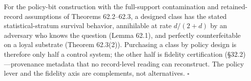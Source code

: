 \begin{thmplain}

For the policy-bit construction with the full-support contamination and retained-record assumptions of Theorems 62.2--62.3, a designed class has the stated statistical-stratum survival behavior, annihilable at rate \(d/(2+d)\) by an adversary who knows the question (Lemma 62.1), and perfectly counterfeitable on a loyal substrate (Theorem 62.3(2)). Purchasing a class by policy design is therefore only half a control system; the other half is fidelity certification (§32.2)---\hspace{0pt}provenance metadata that no record-level reading can reconstruct. The policy lever and the fidelity axis are complements, not alternatives. \(\square\)
\end{thmplain}


